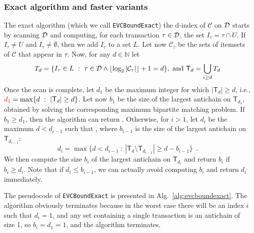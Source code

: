 \subsubsection{Exact algorithm and faster variants}\label{sec:computvcexact}
The exact algorithm (which we call \texttt{EVCBoundExact})  the d-index of
$\mathcal{C}$ on ${\cal D}$ starts by scanning ${\cal D}$ and computing, for each
transaction $\tau\in{\cal D}$, the set $I_\tau=\tau\cap U$. If $I_\tau\neq U$ and
$I_\tau\neq\emptyset$, then we add $I_\tau$ to a set $L$. Let now
$\mathcal{C}_\tau$ be the sets of itemsets of $\mathcal{C}$ that appear in
$\tau$. Now, for any $d\in\mathbb{N}$ let
\[
	T_d=\{I_\tau\in L ~:~ \tau\in{\cal D} \wedge \lfloor\log_2|\mathcal{C}_\tau|\rfloor+1= d\},\mbox{ and } \mathsf{T}_d=\bigcup_{i\ge d} T_d
\]
Once the scan is complete, let $d_1$  be the maximum integer for which
$|\mathsf{T}_d|\ge d$, i.e., $\textcolor{red}{d_1}=\max\{d ~:~ |\mathsf{T}_d|\ge d\}$. Let now
$b_1$ be the size of the largest antichain on $\mathsf{T}_{d_1}$, obtained by
solving the corresponding maximum bipartite matching problem. If $b_1\ge d_1$,
then the algorithm can return . Otherwise, for $i>1$, let $d_i$ be the
maximum $d<d_{i-1}$ such that , where $b_{i-1}$ is the size
of the largest antichain on $\mathsf{T}_{d_{i-1}}$:
\[
	d_i=\max\{d<d_{i-1} ~:~ |\mathsf{T}_d\setminus\mathsf{T}_{d_{i-1}}|\ge d-b_{i-1}\}\enspace.
\]
We then compute the size $b_i$ of the largest antichain on $\mathsf{T}_{d_i}$
and return $b_i$ if $b_i\ge d_i$. Note that if $d_i\le b_{i-1}$, we can actually
avoid computing $b_i$ and return $d_i$ immediately. 

The pseudocode of \texttt{EVCBoundExact} is presented in
Alg.~\ref{alg:evcboundexact}. The algorithm obviously terminates because in the
worst case there will be an index $i$ such that $d_i=1$, and any set containing
a single transaction is an antichain of size 1, so $b_i=d_1=1$, and the
algorithm terminates.


